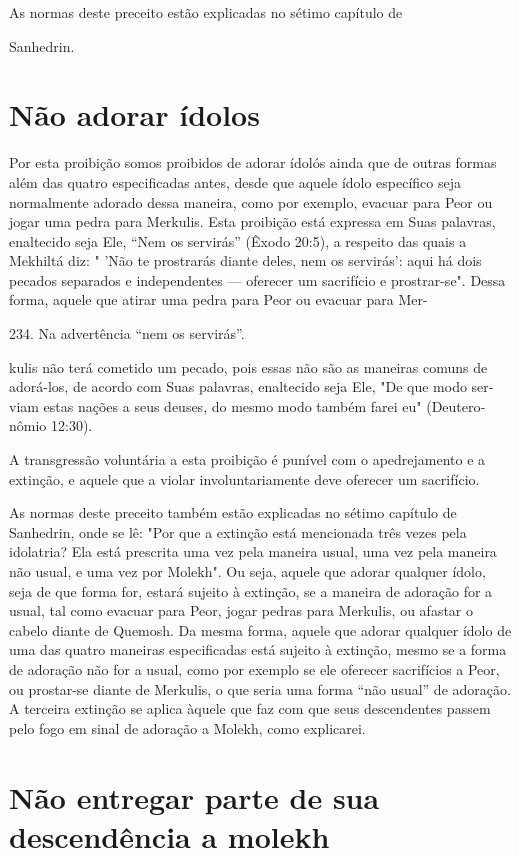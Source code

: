 As normas deste preceito estão explicadas no sétimo capítulo de


Sanhedrin.

\section{Não adorar ídolos}

Por esta proibição somos proibidos de adorar ídolós ainda que de outras
formas além das quatro especificadas antes, desde que aquele ídolo
es­pecífico seja normalmente adorado dessa maneira, como por exemplo,
evacuar para Peor ou jogar uma pedra para Merkulis. Esta proibição está
expressa em Suas palavras, enaltecido seja Ele, ``Nem os servirás'' (Êxodo
20:5), a respeito das quais a Mekhiltá diz: " 'Não te prostrarás diante
deles, nem os servirás': aqui há dois pecados separados e independentes
--- oferecer um sacrifício e prostrar-se". Dessa forma, aquele que
atirar uma pedra para Peor ou evacuar para Mer-

234. Na advertência ``nem os servirás''.


kulis não terá cometido um pecado, pois essas não são as maneiras comuns
de adorá-los, de acordo com Suas palavras, enaltecido seja Ele, "De que
modo ser­viam estas nações a seus deuses, do mesmo modo também farei eu"
(Deutero­nômio 12:30).

A transgressão voluntária a esta proibição é punível com o
apedreja­mento e a extinção, e aquele que a violar involuntariamente
deve oferecer um sacrifício.

As normas deste preceito também estão explicadas no sétimo capí­tulo de
Sanhedrin, onde se lê: "Por que a extinção está mencionada três vezes
pela idolatria? Ela está prescrita uma vez pela maneira usual, uma vez
pela ma­neira não usual, e uma vez por Molekh". Ou seja, aquele que
adorar qualquer ídolo, seja de que forma for, estará sujeito à extinção,
se a maneira de adoração for a usual, tal como evacuar para Peor, jogar
pedras para Merkulis, ou afastar o cabelo diante de Quemosh. Da mesma
forma, aquele que adorar qualquer ídolo de uma das quatro maneiras
especificadas está sujeito à extinção, mesmo se a forma de adoração não
for a usual, como por exemplo se ele oferecer sacri­fícios a Peor, ou
prostar-se diante de Merkulis, o que seria uma forma ``não usual'' de
adoração. A terceira extinção se aplica àquele que faz com que seus
descen­dentes passem pelo fogo em sinal de adoração a Molekh, como
explicarei.

\section{Não entregar parte de sua descendência a molekh}

